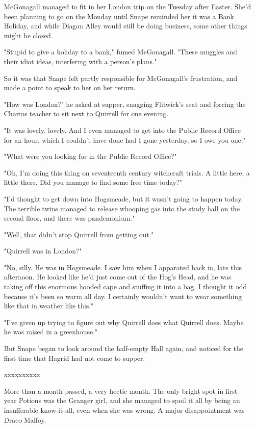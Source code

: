 \documentclass[a4paper,11pt]{article}
\begin{document}
McGonagall managed to fit in her London trip on the Tuesday after Easter. She'd been planning to go on the Monday until Snape reminded her it was a Bank Holiday, and while Diagon Alley would still be doing business, some other things might be closed.

"Stupid to give a holiday to a bank," fumed McGonagall. "These muggles and their idiot ideas, interfering with a person's plans."

So it was that Snape felt partly responsible for McGonagall's frustration, and made a point to speak to her on her return.

"How was London?" he asked at supper, snagging Flitwick's seat and forcing the Charms teacher to sit next to Quirrell for one evening.

"It was lovely, lovely. And I even managed to get into the Public Record Office for an hour, which I couldn't have done had I gone yesterday, so I owe you one."

"What were you looking for in the Public Record Office?"

"Oh, I'm doing this thing on seventeenth century witchcraft trials. A little here, a little there. Did you manage to find some free time today?"

"I'd thought to get down into Hogsmeade, but it wasn't going to happen today. The terrible twins managed to release whooping gas into the study hall on the second floor, and there was pandemonium."

"Well, that didn't stop Quirrell from getting out."

"Quirrell was in London?"

"No, silly. He was in Hogsmeade. I saw him when I apparated back in, late this afternoon. He looked like he'd just come out of the Hog's Head, and he was taking off this enormous hooded cape and stuffing it into a bag. I thought it odd because it's been so warm all day. I certainly wouldn't want to wear something like that in weather like this."

"I've given up trying to figure out why Quirrell does what Quirrell does. Maybe he was raised in a greenhouse."

But Snape began to look around the half-empty Hall again, and noticed for the first time that Hagrid had not come to supper.

xxxxxxxxxx

More than a month passed, a very hectic month. The only bright spot in first year Potions was the Granger girl, and she managed to spoil it all by being an insufferable know-it-all, even when she was wrong. A major disappointment was Draco Malfoy.
\end{document}
